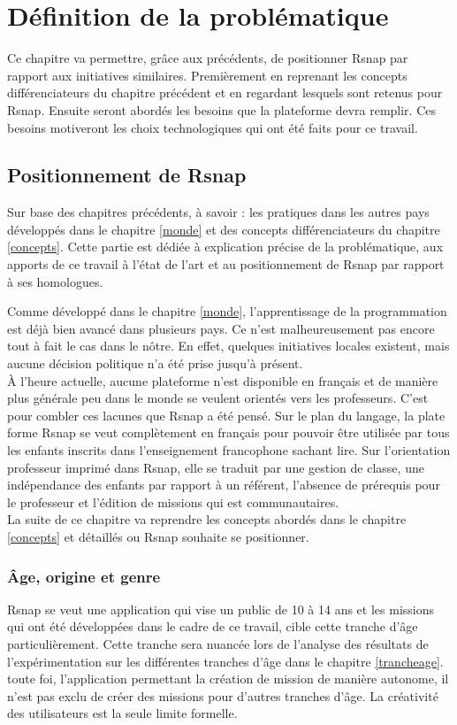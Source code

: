\chapter{Définition de la problématique}
Ce chapitre va permettre, grâce aux précédents, de positionner Rsnap par rapport aux initiatives similaires. Premièrement en reprenant les concepts différenciateurs du chapitre précédent et en regardant lesquels sont retenus pour Rsnap. Ensuite seront abordés les besoins que la plateforme devra remplir. Ces besoins motiveront les choix technologiques qui ont été faits pour ce travail.
\section{Positionnement de Rsnap}
Sur base des chapitres précédents, à savoir : les pratiques dans les autres pays développés dans le chapitre \ref{monde} et des concepts différenciateurs du chapitre \ref{concepts}. Cette partie est dédiée à explication précise de la problématique, aux apports de ce travail à l'état de l'art et au positionnement de Rsnap par rapport à ses homologues.

Comme développé dans le chapitre \ref{monde}, l'apprentissage de la programmation est déjà bien avancé dans plusieurs pays. Ce n'est malheureusement pas encore tout à fait le cas dans le nôtre. En effet, quelques initiatives locales existent, mais aucune décision politique n'a été prise jusqu'à présent.\\

À l'heure actuelle, aucune plateforme n'est disponible en français et de manière plus générale peu dans le monde se veulent orientés vers les professeurs. C'est pour combler ces lacunes que Rsnap a été pensé. Sur le plan du langage, la plate forme Rsnap se veut complètement en français pour pouvoir être utilisée par tous les enfants inscrits dans l'enseignement francophone sachant lire. Sur l'orientation professeur imprimé dans Rsnap, elle se traduit par une gestion de classe, une indépendance des enfants par rapport à un référent, l'absence de prérequis pour le professeur et l'édition de missions qui est communautaires.\\

La suite de ce chapitre va reprendre les concepts abordés dans le chapitre \ref{concepts} et détaillés ou Rsnap souhaite se positionner.

\subsection{Âge, origine et genre} 
Rsnap se veut une application qui vise un public de 10 à 14 ans et les missions qui ont été développées dans le cadre de ce travail, cible cette tranche d'âge particulièrement. Cette tranche sera nuancée lors de l'analyse des résultats de l'expérimentation sur les différentes tranches d'âge dans le chapitre \ref{trancheage}. %
toute foi, l'application permettant la création de mission de manière autonome, il n'est pas exclu de créer des missions pour d'autres tranches d'âge. La créativité des utilisateurs est la seule limite formelle.\\

